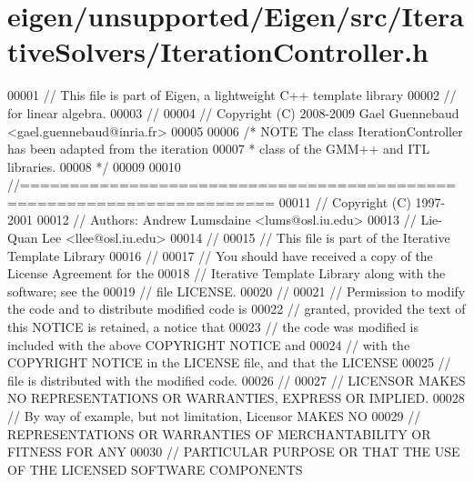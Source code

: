 \hypertarget{eigen_2unsupported_2_eigen_2src_2_iterative_solvers_2_iteration_controller_8h_source}{}\section{eigen/unsupported/\+Eigen/src/\+Iterative\+Solvers/\+Iteration\+Controller.h}
\label{eigen_2unsupported_2_eigen_2src_2_iterative_solvers_2_iteration_controller_8h_source}

\begin{DoxyCode}
00001 \textcolor{comment}{// This file is part of Eigen, a lightweight C++ template library}
00002 \textcolor{comment}{// for linear algebra.}
00003 \textcolor{comment}{//}
00004 \textcolor{comment}{// Copyright (C) 2008-2009 Gael Guennebaud <gael.guennebaud@inria.fr>}
00005 
00006 \textcolor{comment}{/* NOTE The class IterationController has been adapted from the iteration}
00007 \textcolor{comment}{ *      class of the GMM++ and ITL libraries.}
00008 \textcolor{comment}{ */}
00009 
00010 \textcolor{comment}{//=======================================================================}
00011 \textcolor{comment}{// Copyright (C) 1997-2001}
00012 \textcolor{comment}{// Authors: Andrew Lumsdaine <lums@osl.iu.edu> }
00013 \textcolor{comment}{//          Lie-Quan Lee     <llee@osl.iu.edu>}
00014 \textcolor{comment}{//}
00015 \textcolor{comment}{// This file is part of the Iterative Template Library}
00016 \textcolor{comment}{//}
00017 \textcolor{comment}{// You should have received a copy of the License Agreement for the}
00018 \textcolor{comment}{// Iterative Template Library along with the software;  see the}
00019 \textcolor{comment}{// file LICENSE.  }
00020 \textcolor{comment}{//}
00021 \textcolor{comment}{// Permission to modify the code and to distribute modified code is}
00022 \textcolor{comment}{// granted, provided the text of this NOTICE is retained, a notice that}
00023 \textcolor{comment}{// the code was modified is included with the above COPYRIGHT NOTICE and}
00024 \textcolor{comment}{// with the COPYRIGHT NOTICE in the LICENSE file, and that the LICENSE}
00025 \textcolor{comment}{// file is distributed with the modified code.}
00026 \textcolor{comment}{//}
00027 \textcolor{comment}{// LICENSOR MAKES NO REPRESENTATIONS OR WARRANTIES, EXPRESS OR IMPLIED.}
00028 \textcolor{comment}{// By way of example, but not limitation, Licensor MAKES NO}
00029 \textcolor{comment}{// REPRESENTATIONS OR WARRANTIES OF MERCHANTABILITY OR FITNESS FOR ANY}
00030 \textcolor{comment}{// PARTICULAR PURPOSE OR THAT THE USE OF THE LICENSED SOFTWARE COMPONENTS}

\end{DoxyCode}
